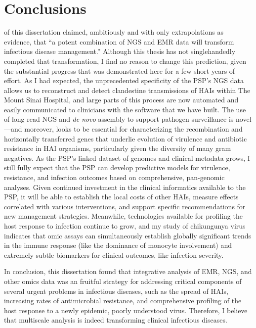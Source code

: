 \section{Conclusions}

 of this dissertation claimed, ambitiously and with only extrapolations as evidence, that ``a potent combination of NGS and EMR data will transform infectious disease management.'' Although this thesis has not singlehandedly completed that transformation, I find no reason to change this prediction, given the substantial progress that was demonstrated here for a few short years of effort. As I had expected, the unprecedented specificity of the PSP's NGS data allows us to reconstruct and detect clandestine transmissions of HAIs within The Mount Sinai Hospital, and large parts of this process are now automated and easily communicated to clinicians with the software that we have built. The use of long read NGS and \emph{de novo} assembly to support pathogen surveillance is novel—and moreover, looks to be essential for characterizing the recombination and horizontally transferred genes that underlie evolution of virulence and antibiotic resistance in HAI organisms, particularly given the diversity of many gram negatives. As the PSP's linked dataset of genomes and clinical metadata grows, I still fully expect that the PSP can develop predictive models for virulence, resistance, and infection outcomes based on comprehensive, pan-genomic analyses. Given continued investment in the clinical informatics available to the PSP, it will be able to establish the local costs of other HAIs, measure effects correlated with various interventions, and support specific recommendations for new management strategies. Meanwhile, technologies available for profiling the host response to infection continue to grow, and my study of chikungunya virus indicates that omic assays can simultaneously establish globally significant trends in the immune response (like the dominance of monocyte involvement) and extremely subtle biomarkers for clinical outcomes, like infection severity.

In conclusion, this dissertation found that integrative analysis of EMR, NGS, and other omics data was an fruitful strategy for addressing critical components of several urgent problems in infectious diseases, such as the spread of HAIs, increasing rates of antimicrobial resistance, and comprehensive profiling of the host response to a newly epidemic, poorly understood virus. Therefore, I believe that multiscale analysis is indeed transforming clinical infectious diseases.